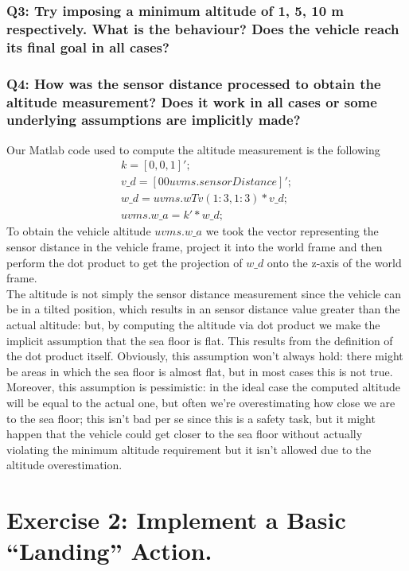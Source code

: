 \documentclass{article}
\begin{document}
\subsubsection{Q3: Try imposing a minimum altitude of 1, 5, 10 m respectively. What is the behaviour? Does the vehicle reach its final goal in all cases?}


\subsubsection{Q4: How was the sensor distance processed to obtain the altitude measurement? Does it work in all cases or some underlying assumptions are implicitly made?}
Our Matlab code used to compute the altitude measurement is the following
\begin{gather*}
	k = [0, 0, 1]'; \\
	v\_d = [0 0 uvms.sensorDistance]'; \\
	w\_d = uvms.wTv(1:3, 1:3) * v\_d; \\
	uvms.w\_a = k' * w\_d;
\end{gather*}
To obtain the vehicle altitude $ uvms.w\_a $ we took the vector representing the sensor distance in the vehicle frame, project it into the world frame and then perform the dot product to get the projection of $ w\_d $ onto the z-axis of the world frame. \\
The altitude is not simply the sensor distance measurement since the vehicle can be in a tilted position, which results in an sensor distance value greater than the actual altitude: but, by computing the altitude via dot product we make the implicit assumption that the sea floor is flat. This results from the definition of the dot product itself. Obviously, this assumption won't always hold: there might be areas in which the sea floor is almost flat, but in most cases this is not true. \\
Moreover, this assumption is pessimistic: in the ideal case the computed altitude will be equal to the actual one, but often we're overestimating how close we are to the sea floor; this isn't bad per se since this is a safety task, but it might happen that the vehicle could get closer to the sea floor without actually violating the minimum altitude requirement but it isn't allowed due to the altitude overestimation.

\clearpage

\section{Exercise 2: Implement a Basic “Landing” Action.}
\end{document}
